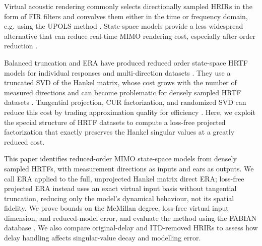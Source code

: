\documentclass[non-peer-review]{fa2026}
\begin{document}
Virtual acoustic rendering commonly selects directionally sampled \acp{HRIR} in the form of \ac{FIR} filters and
convolves them either in the time or frequency domain, e.g. using the \ac{UPOLS} method \cite{wefers2015}. State-space
models provide a less widespread alternative that can reduce real-time \ac{MIMO} rendering cost, especially after order
reduction \cite{adams2007b,adams2008,adams2009a,pelling2021}.

Balanced truncation and \ac{ERA} have produced reduced order state-space \ac{HRTF} models for individual responses and
multi-direction datasets \cite{mackenzie1997,georgiou1999,grantham2005,adams2007b,adams2008,adams2009a}. They use a truncated
\ac{SVD} of the Hankel matrix, whose cost grows with the number of measured directions and can become problematic for
densely sampled \ac{HRTF} datasets \cite{kramer2016,minster2021}. Tangential projection, CUR factorization, and
randomized \ac{SVD} can reduce this cost by trading approximation quality for efficiency
\cite{kramer2016,kramer2018,minster2021,pelling2021,pelling2026}. Here, we exploit the special structure of \ac{HRTF} datasets to
compute a loss-free projected factorization that exactly preserves the Hankel singular values at a greatly reduced cost.

This paper identifies reduced-order \ac{MIMO} state-space models from densely sampled \acp{HRTF}, with measurement
directions as inputs and ears as outputs. We call \ac{ERA} applied to the full, unprojected Hankel matrix direct
\ac{ERA}; loss-free projected \ac{ERA} instead uses an exact virtual input basis without tangential truncation, reducing
only the model's dynamical behaviour, not its spatial fidelity. We prove bounds on the McMillan degree, loss-free
virtual input dimension, and reduced-model error, and evaluate the method using the FABIAN database
\cite{brinkmann2017}. We also compare original-delay and \ac{ITD}-removed \acp{HRIR} to assess how delay handling
affects singular-value decay and modelling error.
%
%
%
%
\end{document}
